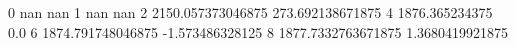 0 nan nan
1 nan nan
2 2150.057373046875 273.692138671875
4 1876.365234375 0.0
6 1874.791748046875 -1.573486328125
8 1877.7332763671875 1.3680419921875
